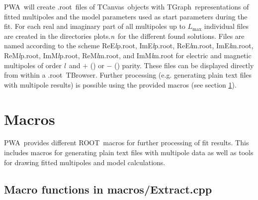 \documentclass[a4paper,10pt]{article}
\def\PWA{\ttfamily PWA\rmfamily\ }
\def\tt{\ttfamily}
\def\rm{\rmfamily}
\begin{document}
\PWA will create \tt .root\rm\ files of \tt TCanvas\rm\ objects with \tt TGraph\rm\ representations of fitted multipoles
and the model parameters used as start parameters during the fit. For each real and imaginary part of all multipoles up to
$L_\mathrm{max}$ individual files are created in the directories \tt plots.\textit{n}\rm\ for the different found solutions.
Files are named according to the scheme 
\tt ReE\textit{l}p.root\rm, \tt ImE\textit{l}p.root\rm,
\tt ReE\textit{l}m.root\rm, \tt ImE\textit{l}m.root\rm,
\tt ReM\textit{l}p.root\rm, \tt ImM\textit{l}p.root\rm,
\tt ReM\textit{l}m.root\rm, and \tt ImM\textit{l}m.root\rm
for electric and magnetic multipoles of order \tt\textit{l}\rm\ and $+$ (\tt{p}\rm) or $-$ (\tt{m}\rm) parity.
These files can be displayed directly from within a \tt .root\rm\ \tt TBrowser\rm.
Further processing (e.g. generating plain text files with multipole results) is possible using the provided macros (see section
\ref{sec_macros}).

\section{Macros}\label{sec_macros}

\PWA provides different \tt ROOT\rm\ macros for further processing of fit results. This includes macros for generating plain text
files with multipole data as well as tools for drawing fitted multipoles and model calculations.

\subsection{Macro functions in  \tt macros/Extract.cpp\rm}
\end{document}

